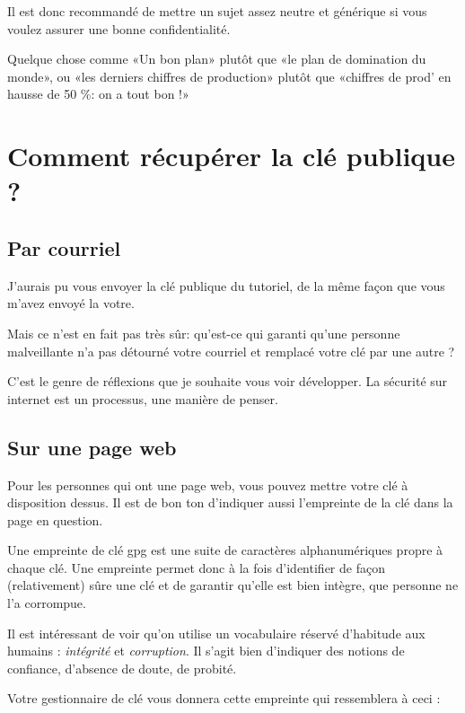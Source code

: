 Il est donc recommandé de mettre un sujet assez neutre et générique si
vous voulez assurer une bonne confidentialité.

Quelque chose comme «Un bon plan» plutôt que «le plan de domination du
monde», ou «les derniers chiffres de production» plutôt que «chiffres de
prod' en hausse de 50 \%: on a tout bon !»

\section{Comment récupérer la clé publique ?}\label{comment-ruxe9cupuxe9rer-la-cluxe9-publique}

\subsection{Par courriel}\label{par-courriel}

J'aurais pu vous envoyer la clé publique du tutoriel, de la même façon
que vous m'avez envoyé la votre.

Mais ce n'est en fait pas très sûr: qu'est-ce qui garanti qu'une
personne malveillante n'a pas détourné votre courriel et remplacé votre
clé par une autre ?

C'est le genre de réflexions que je souhaite vous voir développer. La
sécurité sur internet est un processus, une manière de penser.

\subsection{Sur une page web}\label{sur-une-page-web}

Pour les personnes qui ont une page web, vous pouvez mettre votre clé à
disposition dessus. Il est de bon ton d'indiquer aussi l'empreinte de la
clé dans la page en question.

Une empreinte de clé gpg est une suite de caractères alphanumériques
propre à chaque clé. Une empreinte permet donc à la fois d'identifier de
façon (relativement) sûre une clé et de garantir qu'elle est bien
intègre, que personne ne l'a corrompue.

Il est intéressant de voir qu'on utilise un vocabulaire réservé
d'habitude aux humains : \emph{intégrité} et \emph{corruption}. Il
s'agit bien d'indiquer des notions de confiance, d'absence de doute, de
probité.

Votre gestionnaire de clé vous donnera cette empreinte qui ressemblera à
ceci :

\begin{center}
\end{center}

